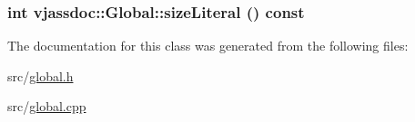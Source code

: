 \hypertarget{classvjassdoc_1_1Global_2029ac82912ebe23066c48e13ab2b1a2}{
\subsubsection{\setlength{\rightskip}{0pt plus 5cm}int vjassdoc::Global::sizeLiteral () const}}
\label{classvjassdoc_1_1Global_2029ac82912ebe23066c48e13ab2b1a2}




The documentation for this class was generated from the following files:\begin{CompactItemize}
\item 
src/\hyperlink{global_8h}{global.h}\item 
src/\hyperlink{global_8cpp}{global.cpp}\end{CompactItemize}
